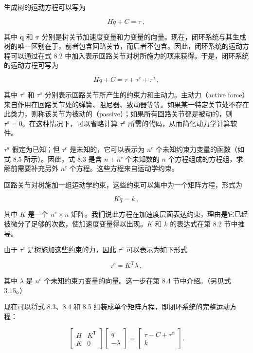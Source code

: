 \documentclass[10pt,a4paper]{book}
\theoremstyle{thmstyle} %
\theoremstyle{defstyle} %
\theoremstyle{prostyle} %
\begin{document}
生成树的运动方程可以写为



$$
H \ddot { q } + C = \tau \ ,
$$



其中 $\ddot{\boldsymbol{q}}$ 和 $\boldsymbol{\tau}$ 分别是树关节加速度变量和力变量的向量。现在，闭环系统与其生成树的唯一区别在于，前者包含回路关节，而后者不包含。因此，闭环系统的运动方程可以通过在式 8.2 中加入表示回路关节对树所施力的项来获得。于是，闭环系统的运动方程可写为



$$
H \ddot { q } + C = \tau + \tau ^{c} + \tau ^{a} \, ,
$$



其中 $\tau^{c}$ 和 $\tau^{a}$ 分别表示回路关节所产生的约束力和主动力。主动力（active force）来自作用在回路关节处的弹簧、阻尼器、致动器等等。如果某一特定关节处不存在此类力，则称该关节为被动的（passive）；如果所有回路关节都是被动的，则 $\tau^{a}=0$。在这种情况下，可以省略计算 $\tau^{a}$ 所需的代码，从而简化动力学计算软件。



$\tau^{a}$ 假定为已知；但 $\tau^{c}$ 是未知的，它可以表示为 $n^{c}$ 个未知约束力变量的函数（如式 8.5 所示）。因此，式 8.3 是含 $n + n^{c}$ 个未知数的 $n$ 个方程组成的方程组，求解前需要补充另外 $n^{c}$ 个方程。这些方程来自运动学约束。



回路关节对树施加一组运动学约束，这些约束可以集中为一个矩阵方程，形式为



$$
K \ddot { q } = k \, ,
$$



其中 $K$ 是一个 $n^{c} \times n$ 矩阵。我们说此方程在加速度层面表达约束，理由是它已经被微分了足够的次数，使加速度变量得以出现。$K$ 和 $k$ 的表达式在第 8.2 节中推导。



由于 $\tau^{c}$ 是树施加这些约束的力，因此 $\tau^{c}$ 可以表示为如下形式



$$
\tau ^{c} = K ^{\mathrm { T} } \lambda \, ,
$$



其中 $\lambda$ 是 $n^{c}$ 个未知约束力变量的向量。这一步在第 8.4 节中介绍。（另见式 3.15。）



现在可以将式 8.3、8.4 和 8.5 组装成单个矩阵方程，即闭环系统的完整运动方程：



$$
\left[ \begin{array}{ll} { H } & { K ^{\mathrm { T} } } \\{ K } & { 0 } \end{array} \right] \left[ \begin{array}{l} { \ddot { q } } \\{ - \lambda } \end{array} \right] = \left[ \begin{array}{l} { \tau - C + \tau ^{\alpha} } \\{ k } \end{array} \right] .
$$
\end{document}

